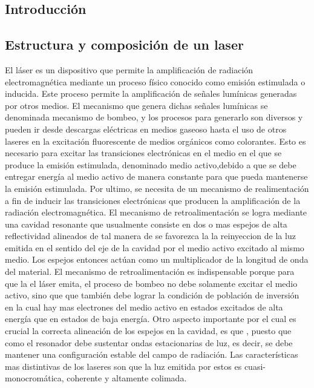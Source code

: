 \documentclass[10pt, a4paper]{article}%
\begin{document}
\begin{multicols}{2} %
\tableofcontents %

\section{Introducción}

\subsection{Estructura y composición de un laser}

El láser es un dispositivo que permite la amplificación de radiación electromagnética mediante un proceso físico conocido como emisión estimulada o inducida. Este proceso permite la amplificación de señales lumínicas generadas por otros medios. El mecanismo que genera dichas señales lumínicas se denominada mecanismo de bombeo, y los procesos para generarlo son diversos y pueden ir desde descargas eléctricas en medios gaseoso hasta el uso de otros laseres en la excitación fluorescente de medios orgánicos como colorantes. Esto es necesario para excitar las transiciones electrónicas en el medio en el que se produce la emisión estimulada, denominado medio activo,debido a que se debe entregar energía al medio activo de manera constante para que pueda mantenerse la emisión estimulada. Por ultimo, se necesita de un mecanismo de realimentación a fin de inducir las transiciones electrónicas que producen la amplificación de la radiación electromagnética. El mecanismo de retroalimentación se logra mediante una cavidad resonante que usualmente consiste en dos o mas espejos de alta reflectividad alineados de tal manera de se favorezca la la reinyeccion de la luz emitida en el sentido del eje de la cavidad por el medio activo excitado al mismo medio. Los espejos entonces actúan como un multiplicador de la longitud de onda del material. El mecanismo de retroalimentación es indispensable porque para que la el láser emita, el proceso de bombeo no debe solamente excitar el medio activo, sino que que también debe lograr la condición de población de inversión en la cual hay mas electrones del medio activo en estados excitados de alta energía que en estados de baja energía.
Otro aspecto importante por el cual es crucial la correcta alineación de los espejos en la cavidad, es que , puesto que como el resonador debe sustentar ondas estacionarias de luz, es decir, se debe mantener una configuración estable del campo de radiación.
\newline
Las características mas distintivas de los laseres son que la luz emitida por estos es cuasi-monocromática, coherente y altamente colimada.


\end{multicols}
\end{document}
